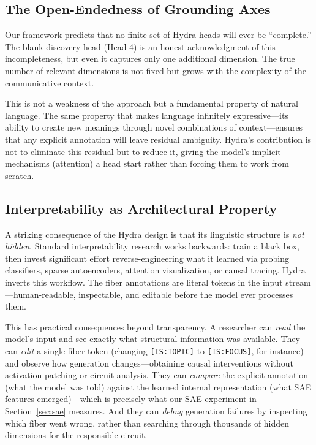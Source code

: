 \documentclass[11pt]{article}
\begin{document}
\subsection{The Open-Endedness of Grounding Axes}

Our framework predicts that no finite set of Hydra heads will ever be 
``complete.'' The blank discovery head (Head 4) is an honest acknowledgment 
of this incompleteness, but even it captures only one additional dimension. 
The true number of relevant dimensions is not fixed but grows with the 
complexity of the communicative context.

This is not a weakness of the approach but a fundamental property of 
natural language. The same property that makes language infinitely expressive---its 
ability to create new meanings through novel combinations of context---ensures 
that any explicit annotation will leave residual ambiguity. Hydra's contribution 
is not to eliminate this residual but to reduce it, giving the model's 
implicit mechanisms (attention) a head start rather than forcing them to 
work from scratch.

\subsection{Interpretability as Architectural Property}

A striking consequence of the Hydra design is that its linguistic 
structure is \emph{not hidden}. Standard interpretability research works 
backwards: train a black box, then invest significant effort 
reverse-engineering what it learned via probing classifiers, sparse 
autoencoders, attention visualization, or causal tracing. Hydra inverts 
this workflow. The fiber annotations are literal tokens in the input 
stream---human-readable, inspectable, and editable before the model 
ever processes them.

This has practical consequences beyond transparency. A researcher can 
\emph{read} the model's input and see exactly what structural information 
was available. They can \emph{edit} a single fiber token (changing 
\texttt{[IS:TOPIC]} to \texttt{[IS:FOCUS]}, for instance) and observe 
how generation changes---obtaining causal interventions without 
activation patching or circuit analysis. They can \emph{compare} the 
explicit annotation (what the model was told) against the learned 
internal representation (what SAE features emerged)---which is precisely 
what our SAE experiment in Section~\ref{sec:sae} measures. And they 
can \emph{debug} generation failures by inspecting which fiber went 
wrong, rather than searching through thousands of hidden dimensions 
for the responsible circuit.
\end{document}
